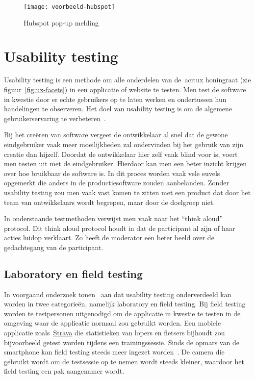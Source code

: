 \begin{figure}
    \centering
    \texttt{[image: voorbeeld-hubspot]}
    \caption[Voorbeeld Hubspot]{Hubspot pop-up melding}
    \label{fig:ux-voorbeeld-hubspot}
\end{figure}

\section{Usability testing}
\label{sec:usability-testing}

Usability testing is een methode om alle onderdelen van de~\acrlong{acr:ux} honingraat (zie figuur~\ref{fig:ux-facets}) in een applicatie of website te testen. Men test de software in kwestie door er echte gebruikers op te laten werken en ondertussen hun handelingen te observeren. Het doel van usability testing is om de algemene gebruikerservaring te verbeteren~\autocite{Hotjar2020}.

Bij het creëren van software vergeet de ontwikkelaar al snel dat de gewone eindgebruiker vaak meer moeilijkheden zal ondervinden bij het gebruik van zijn creatie dan hijzelf. Doordat de ontwikkelaar hier zelf vaak blind voor is, voert men testen uit met de eindgebruiker. Hierdoor kan men een beter inzicht krijgen over hoe bruikbaar de software is. In dit proces worden vaak vele euvels opgemerkt die anders in de productiesoftware zouden aanbelanden.
Zonder usability testing zou men vaak vast komen te zitten met een product dat door het team van ontwikkelaars wordt begrepen, maar door de doelgroep niet.

In onderstaande testmethoden verwijst men vaak naar het ``think aloud'' protocol. Dit think aloud protocol houdt in dat de participant al zijn of haar acties luidop verklaart. Zo heeft de moderator een beter beeld over de gedachtegang van de participant.

\subsection{Laboratory en field testing}
\label{sec:usability-testing:lab-field-testing}

In voorgaand onderzoek tonen~\textcite{Kaikkonen2005} aan dat usability testing onderverdeeld kan worden in twee categorieën, namelijk laboratory en field testing. Bij field testing worden te testpersonen uitgenodigd om de applicatie in kwestie te testen in de omgeving waar de applicatie normaal zou gebruikt worden. Een mobiele applicatie zoals~\href{https://www.strava.com/}{Strava} die statistieken van lopers en fietsers bijhoudt zou bijvoorbeeld getest worden tijdens een trainingssessie. Sinds de opmars van de smartphone kan field testing steeds meer ingezet worden~\autocite{Kjeldskov2004}. De camera die gebruikt wordt om de testsessie op te nemen wordt steeds kleiner, waardoor het field testing een pak aangenamer wordt.

